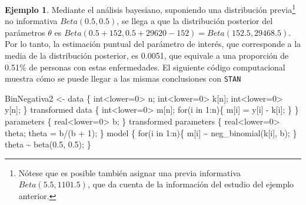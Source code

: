 \documentclass[
  10pt,
  spanish,
]{book}
\newenvironment{Shaded}{\begin{snugshade}}{\end{snugshade}}
\newcommand{\NormalTok}[1]{#1}
\newcommand{\OtherTok}[1]{\textcolor[rgb]{0.56,0.35,0.01}{#1}}
\newcommand{\StringTok}[1]{\textcolor[rgb]{0.31,0.60,0.02}{#1}}
\theoremstyle{definition}
\theoremstyle{definition}
\newtheorem{example}{Ejemplo}[chapter]
\theoremstyle{definition}
\theoremstyle{definition}
\theoremstyle{remark}
\begin{document}
\begin{example}
Mediante el análisis bayesiano, suponiendo una distribución previa\footnote{Nótese que es posible también asignar una previa informativa \(Beta(5.5, 1101.5)\), que da cuenta de la información del estudio del ejemplo anterior.} no informativa \(Beta(0.5, 0.5)\), se llega a que la distribución posterior del parámetros \(\theta\) es \(Beta(0.5+152, 0.5+29620-152)=Beta(152.5, 29468.5)\). Por lo tanto, la estimación puntual del parámetro de interés, que corresponde a la media de la distribución posterior, es 0.0051, que equivale a una proporción de 0.51\% de personas con estas enfermedades. El siguiente código computacional muestra cómo se puede llegar a las mismas conclusiones con \texttt{STAN}
\end{example}

\begin{Shaded}
\begin{Highlighting}[]
\NormalTok{BinNegativa2 }\OtherTok{\textless{}{-}} \StringTok{\textquotesingle{}data \{}
\StringTok{  int\textless{}lower=0\textgreater{} n;}
\StringTok{  int\textless{}lower=0\textgreater{} k[n];}
\StringTok{  int\textless{}lower=0\textgreater{} y[n];}
\StringTok{\}}
\StringTok{transformed data \{}
\StringTok{  int\textless{}lower=0\textgreater{} m[n];}
\StringTok{  for(i in 1:n)\{}
\StringTok{    m[i] = y[i] {-} k[i];}
\StringTok{  \}}
\StringTok{\}}
\StringTok{parameters \{}
\StringTok{  real\textless{}lower=0\textgreater{} b;}
\StringTok{\}}
\StringTok{transformed parameters \{}
\StringTok{  real\textless{}lower=0\textgreater{} theta;}
\StringTok{  theta = b/(b + 1);}
\StringTok{\}}
\StringTok{model \{}
\StringTok{  for(i in 1:n)\{}
\StringTok{    m[i] \textasciitilde{} neg\_binomial(k[i], b);}
\StringTok{  \}}
\StringTok{  theta \textasciitilde{} beta(0.5, 0.5);}
\StringTok{\}}
\StringTok{\textquotesingle{}}


\end{Highlighting}
\end{Shaded}
\end{document}
